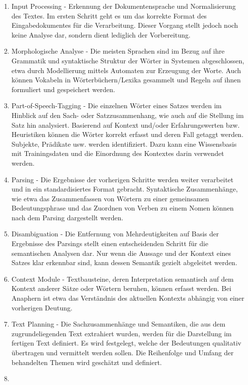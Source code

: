 \documentclass[12pt]{report}
\begin{document}
\begin{enumerate}
\item
Input Processing - Erkennung der Dokumentensprache und Normalisierung des Textes. Im ersten Schritt geht es um das korrekte Format des Eingabedokumentes für die Verarbeitung. Dieser Vorgang stellt jedoch noch keine Analyse dar, sondern dient lediglich der Vorbereitung.
\item
Morphologische Analyse - Die meisten Sprachen sind im Bezug auf ihre Grammatik und syntaktische Struktur der Wörter in Systemen abgeschlossen, etwa durch Modellierung mittels Automaten zur Erzeugung der Worte. Auch können Vokabeln in Wörterbüchern/Lexika gesammelt und Regeln auf ihnen formuliert und gespeichert werden.
\item
Part-of-Speech-Tagging - Die einzelnen Wörter eines Satzes werden im Hinblick auf den Sach- oder Satzzusammenhang, wie auch auf die Stellung im Satz hin analysiert. Basierend auf Kontext und/oder Erfahrungswerten bzw. Heuristiken können die Wörter korrekt erfasst und deren Fall getaggt werden. Subjekte, Prädikate usw. werden identifiziert. Dazu kann eine Wissensbasis mit Trainingsdaten und die Einordnung des Kontextes darin verwendet werden.
\item
Parsing - Die Ergebnisse der vorherigen Schritte werden weiter verarbeitet und in ein standardisiertes Format gebracht. Syntaktische Zusammenhänge, wie etwa das Zusammenfassen von Wörtern zu einer gemeinsamen Bedeutungsphrase und das Zuordnen von Verben zu einem Nomen können nach dem Parsing dargestellt werden.
\item
Disambiguation - Die Entfernung von Mehrdeutigkeiten auf Basis der Ergebnisse des Parsings stellt einen entscheidenden Schritt für die semantischen Analysen dar. Nur wenn die Aussage und der Kontext eines Satzes klar erkennbar sind, kann dessen Semantik gezielt abgeleitet werden.
\item
Context Module - Textbausteine, deren Interpretation semantisch auf dem Kontext anderer Sätze oder Wörtern beruhen, können erfasst werden. Bei Anaphern ist etwa das Verständnis des aktuellen Kontexts abhängig von einer vorherigen Deutung.
\item
Text Planning - Die Sachzusammenhänge und Semantiken, die aus dem zugrundeliegenden Text extrahiert wurden, werden für die Darstellung im fertigen Text definiert. Es wird festgelegt, welche der Bedeutungen qualitativ übertragen und vermittelt werden sollen. Die Reihenfolge und Umfang der behandelten Themen wird geschätzt und definiert.
\item

\end{enumerate}
\end{document}

